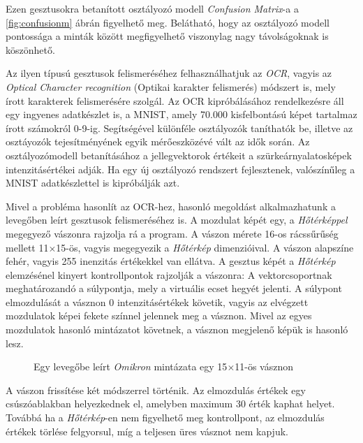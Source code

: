 Ezen gesztusokra betanított osztályozó modell \textit{Confusion Matrix}-a a \ref{fig:confusionm} ábrán figyelhető meg. Belátható, hogy az osztályozó modell pontossága a minták között megfigyelhető viszonylag nagy távolságoknak is köszönhető.

Az ilyen típusú gesztusok felismeréséhez felhasználhatjuk az \textit{OCR}, vagyis az \textit{Optical Character recognition} (Optikai karakter felismerés) módszert is, mely írott karakterek felismerésére szolgál. 
Az OCR kipróbálásához rendelkezésre áll egy ingyenes adatkészlet is, a MNIST, amely 70.000 kisfelbontású képet tartalmaz írott számokról 0-9-ig. Segítségével különféle osztályozók taníthatók be, illetve az osztáyozók tejesítményének egyik mérőeszközévé vált az idők során. Az osztályozómodell betanításához a jellegvektorok értékeit a szürkeárnyalatosképek intenzitásértékei adják. Ha egy új osztályozó rendszert fejlesztenek, valószínűleg a MNIST adatkészlettel is kipróbálják azt. \cite{geron2019hands}

Mivel a probléma hasonlít az OCR-hez, hasonló megoldást alkalmazhatunk a levegőben leírt gesztusok felismeréséhez is. A mozdulat képét egy, a \textit{Hőtérképpel} megegyező vászonra rajzolja rá a program. A vászon mérete 16-os rácssűrűség mellett 11$\times$15-ös, vagyis megegyezik a \textit{Hőtérkép} dimenzióival. A vászon alapszíne fehér, vagyis 255 inenzitás értékekkel van ellátva. A gesztus képét a \textit{Hőtérkép} elemzésénel kinyert kontrollpontok rajzolják a vászonra: A vektorcsoportnak meghatározandó a súlypontja, mely a virtuális ecset hegyét jelenti. A súlypont elmozdulását a vásznon 0 intenzitásértékek követik, vagyis az elvégzett mozdulatok képei fekete színnel jelennek meg a vásznon. Mivel az egyes mozdulatok hasonló mintázatot követnek, a vásznon megjelenő képük is hasonló lesz.

\begin{figure}[h]
\centering
{}
\caption{Egy levegőbe leírt \textit{Omikron} mintázata egy 15$\times$11-ös vásznon}
\label{fig:ocr-gesture}
\end{figure}

A vászon frissítése két módszerrel történik. Az elmozdulás értékek egy csúszóablakban helyezkednek el, amelyben maximum  30 érték kaphat helyet. Továbbá ha a \textit{Hőtérkép}-en nem figyelhető meg kontrollpont, az elmozdulás értékek törlése felgyorsul, míg a teljesen üres vásznot nem kapjuk.

